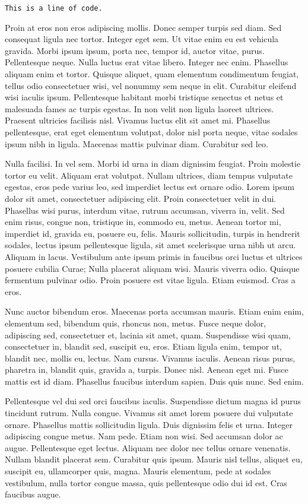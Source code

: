 \texttt{This is a line of code.}

Proin at eros non eros adipiscing mollis. Donec semper turpis sed diam. Sed consequat ligula nec tortor. Integer eget sem. Ut vitae enim eu est vehicula gravida. Morbi ipsum ipsum, porta nec, tempor id, auctor vitae, purus. Pellentesque neque. Nulla luctus erat vitae libero. Integer nec enim. Phasellus aliquam enim et tortor. Quisque aliquet, quam elementum condimentum feugiat, tellus odio consectetuer wisi, vel nonummy sem neque in elit. Curabitur eleifend wisi iaculis ipsum. Pellentesque habitant morbi tristique senectus et netus et malesuada fames ac turpis egestas. In non velit non ligula laoreet ultrices. Praesent ultricies facilisis nisl. Vivamus luctus elit sit amet mi. Phasellus pellentesque, erat eget elementum volutpat, dolor nisl porta neque, vitae sodales ipsum nibh in ligula. Maecenas mattis pulvinar diam. Curabitur sed leo.

Nulla facilisi. In vel sem. Morbi id urna in diam dignissim feugiat. Proin molestie tortor eu velit. Aliquam erat volutpat. Nullam ultrices, diam tempus vulputate egestas, eros pede varius leo, sed imperdiet lectus est ornare odio. Lorem ipsum dolor sit amet, consectetuer adipiscing elit. Proin consectetuer velit in dui. Phasellus wisi purus, interdum vitae, rutrum accumsan, viverra in, velit. Sed enim risus, congue non, tristique in, commodo eu, metus. Aenean tortor mi, imperdiet id, gravida eu, posuere eu, felis. Mauris sollicitudin, turpis in hendrerit sodales, lectus ipsum pellentesque ligula, sit amet scelerisque urna nibh ut arcu. Aliquam in lacus. Vestibulum ante ipsum primis in faucibus orci luctus et ultrices posuere cubilia Curae; Nulla placerat aliquam wisi. Mauris viverra odio. Quisque fermentum pulvinar odio. Proin posuere est vitae ligula. Etiam euismod. Cras a eros.

Nunc auctor bibendum eros. Maecenas porta accumsan mauris. Etiam enim enim, elementum sed, bibendum quis, rhoncus non, metus. Fusce neque dolor, adipiscing sed, consectetuer et, lacinia sit amet, quam. Suspendisse wisi quam, consectetuer in, blandit sed, suscipit eu, eros. Etiam ligula enim, tempor ut, blandit nec, mollis eu, lectus. Nam cursus. Vivamus iaculis. Aenean risus purus, pharetra in, blandit quis, gravida a, turpis. Donec nisl. Aenean eget mi. Fusce mattis est id diam. Phasellus faucibus interdum sapien. Duis quis nunc. Sed enim.

Pellentesque vel dui sed orci faucibus iaculis. Suspendisse dictum magna id purus tincidunt rutrum. Nulla congue. Vivamus sit amet lorem posuere dui vulputate ornare. Phasellus mattis sollicitudin ligula. Duis dignissim felis et urna. Integer adipiscing congue metus. Nam pede. Etiam non wisi. Sed accumsan dolor ac augue. Pellentesque eget lectus. Aliquam nec dolor nec tellus ornare venenatis. Nullam blandit placerat sem. Curabitur quis ipsum. Mauris nisl tellus, aliquet eu, suscipit eu, ullamcorper quis, magna. Mauris elementum, pede at sodales vestibulum, nulla tortor congue massa, quis pellentesque odio dui id est. Cras faucibus augue.

